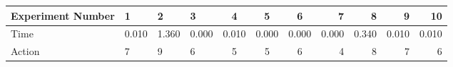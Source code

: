 \documentclass[8pt]{article}
\begin{document}
\begin{landscape}
\begin{tabular}{ | l | l | l | l | c | c | c | r | r | r | r | }
 \hline 
Experiment Number & 1 & 2 & 3 & 4 & 5 & 6 & 7 & 8 & 9 & 10\\ \hline
Time & 0.010 & 1.360 & 0.000 & 0.010 & 0.000 & 0.000 & 0.000 & 0.340 & 0.010 & 0.010\\ \hline
Action & 7 & 9 & 6 & 5 & 5 & 6 & 4 & 8 & 7 & 6\\ \hline\end{tabular}
\end{landscape}
\end{document}
